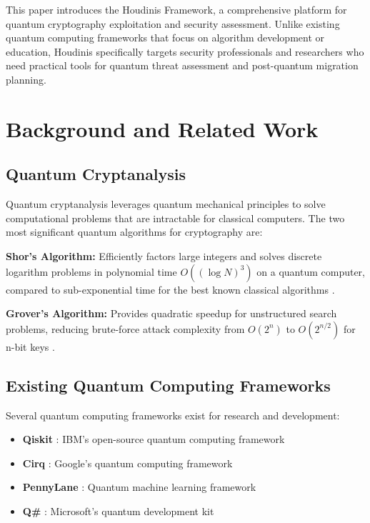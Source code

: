 \documentclass[11pt]{article}
\begin{document}
This paper introduces the Houdinis Framework, a comprehensive platform for quantum cryptography exploitation and security assessment. Unlike existing quantum computing frameworks that focus on algorithm development or education, Houdinis specifically targets security professionals and researchers who need practical tools for quantum threat assessment and post-quantum migration planning.

\section{Background and Related Work}

\subsection{Quantum Cryptanalysis}

Quantum cryptanalysis leverages quantum mechanical principles to solve computational problems that are intractable for classical computers. The two most significant quantum algorithms for cryptography are:

\textbf{Shor's Algorithm:} Efficiently factors large integers and solves discrete logarithm problems in polynomial time $O((\log N)^3)$ on a quantum computer, compared to sub-exponential time for the best known classical algorithms \cite{shor1994algorithms}.

\textbf{Grover's Algorithm:} Provides quadratic speedup for unstructured search problems, reducing brute-force attack complexity from $O(2^n)$ to $O(2^{n/2})$ for n-bit keys \cite{grover1996fast}.

\subsection{Existing Quantum Computing Frameworks}

Several quantum computing frameworks exist for research and development:

\begin{itemize}
\item \textbf{Qiskit} \cite{qiskit2019}: IBM's open-source quantum computing framework
\item \textbf{Cirq} \cite{cirq2019}: Google's quantum computing framework
\item \textbf{PennyLane} \cite{pennylane2018}: Quantum machine learning framework
\item \textbf{Q\#} \cite{qsharp2017}: Microsoft's quantum development kit
\end{itemize}
\end{document}
